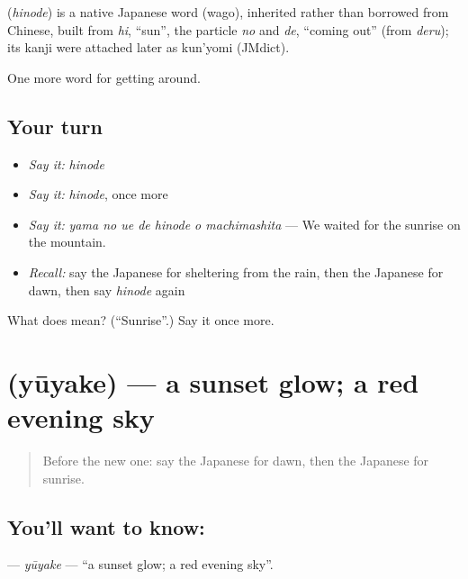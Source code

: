 \begin{cousinweb}
\textbf{} (\emph{hinode}) is a native Japanese word (wago), inherited rather than borrowed from Chinese, built from \emph{hi}, \textquotedblleft{}sun\textquotedblright{}, the particle \emph{no} and \emph{de}, \textquotedblleft{}coming out\textquotedblright{} (from \emph{deru}); its kanji were attached later as kun'yomi (JMdict).
\end{cousinweb}

\begin{grammarlens}[title={What you've built}]
One more word for getting around.
\end{grammarlens}

\subsection*{Your turn}
\begin{itemize}
\raggedright
  \item \emph{Say it:} \emph{hinode}
  \item \emph{Say it:} \emph{hinode}, once more
  \item \emph{Say it:} \emph{yama no ue de hinode o machimashita} — We waited for the sunrise on the mountain.
  \item \emph{Recall:} say the Japanese for sheltering from the rain, then the Japanese for dawn, then say \emph{hinode} again
\end{itemize}

\begin{tcolorbox}[breakable,colback=teal!4,colframe=teal!35!black,title={Before you move on}]
What does  mean? (\textquotedblleft{}Sunrise\textquotedblright{}.) Say it once more.
\end{tcolorbox}
\section[\texorpdfstring{\ja{ゆうやけ} (yūyake)}{ゆうやけ (yūyake)}]{ (yūyake) — a sunset glow; a red evening sky}

\label{lesson:JA-C416-yuuyake}



\begin{quote}
Before the new one: say the Japanese for dawn, then the Japanese for sunrise.
\end{quote}

\subsection*{You'll want to know: }
\textbf{} — \emph{yūyake} — \textquotedblleft{}a sunset glow; a red evening sky\textquotedblright{}.

